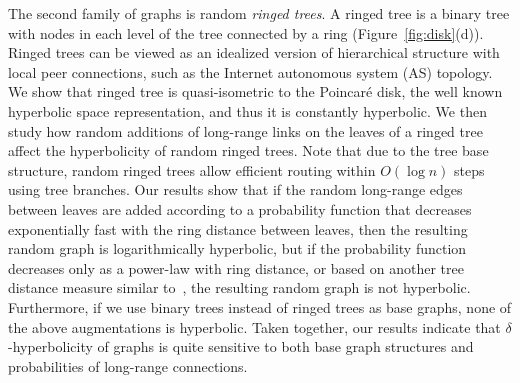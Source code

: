 \documentclass[11pt]{article}
\begin{document}
The second family of graphs is random {\em ringed trees}.
A ringed tree is a binary tree with nodes in each level of the tree connected
	by a ring (Figure~\ref{fig:disk}(d)).
Ringed trees can be viewed as an idealized version of hierarchical structure
	with local peer connections, such as the Internet autonomous system (AS)
	topology.
We show that ringed tree is quasi-isometric to the Poincar\'{e} 
disk, the well known hyperbolic space representation, and thus it
	is constantly hyperbolic.
We then study how random additions of long-range links on the leaves of
	a ringed tree affect the hyperbolicity of random ringed trees.
Note that due to the tree base structure, random ringed trees allow
	efficient routing within $O(\log n)$ steps using tree branches.
Our results show that if the random long-range edges 
	between leaves are added according to a
	probability function that decreases exponentially fast with the ring
	distance between leaves, then the resulting random graph is 
	logarithmically hyperbolic, but if the probability function decreases
	only as a power-law with ring distance, or based on another
	tree distance measure similar to~\cite{Kle01}, the resulting random graph
	is not hyperbolic.
Furthermore, if we use binary trees instead of ringed trees as base graphs,
	none of the above augmentations is hyperbolic.
Taken together, our results indicate that $\delta$-hyperbolicity of graphs
	is quite sensitive to both base graph structures and probabilities of
	long-range connections.




\end{document}
